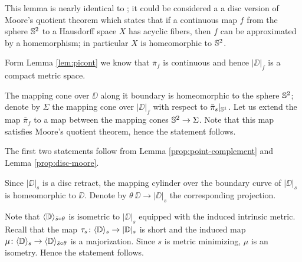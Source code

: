 This lemma is nearly identical to \cite[Corollary 7.12]{LW3}; it could be considered a a disc version of Moore's quotient theorem \cite{moore}
which states that if a continuous map $f$ from the sphere $\mathbb{S}^2$ to a Hausdorff space $X$
has acyclic fibers, then $f$ can be approximated by a homemorphism; in particular $X$ is homeomorphic to $\mathbb{S}^2$.

Form Lemma \ref{lem:picont} we know that $\bar\pi_f$ is continuous and hence $|\DD|_f$
is a compact metric space. 


The mapping cone over $\DD$ along it boundary is homeomorphic to the sphere $\mathbb{S}^2$;
denote by $\Sigma$ the mapping cone over $|\DD|_f$ with respect to $\bar\pi_s|_{\mathbb{S}^1}$.
Let us extend the map $\bar\pi_f$ to a map between the mapping cones $\mathbb{S}^2\to\Sigma$.
Note that this map satisfies Moore's quotient theorem, hence the statement follows.
\qeds

The first two statements follow from Lemma \ref{prop:point-complement} and Lemma \ref{prop:disc-moore}.

Since $|\DD|_s$ is a disc retract, the mapping cylinder over the boundary curve of $|\DD|_s$ is homeomorphic to $\DD$.
Denote by $\theta\:\DD\to |\DD|_s$ the corresponding projection.

Note that $\langle\mathbb{D}\rangle_{\bar s\circ\theta}$ is isometric to $|\DD|_s$ equipped with the induced intrinsic metric.
Recall that the map $\tau_s\colon\langle\mathbb{D}\rangle_s\to|\mathbb{D}|_s$ is short and the induced map $\mu\colon\langle\mathbb{D}\rangle_s\to\langle\mathbb{D}\rangle_{\bar s\circ\theta}$ is a majorization.
Since $s$ is metric minimizing, $\mu$ is an isometry.
Hence the statement follows.
\qeds
